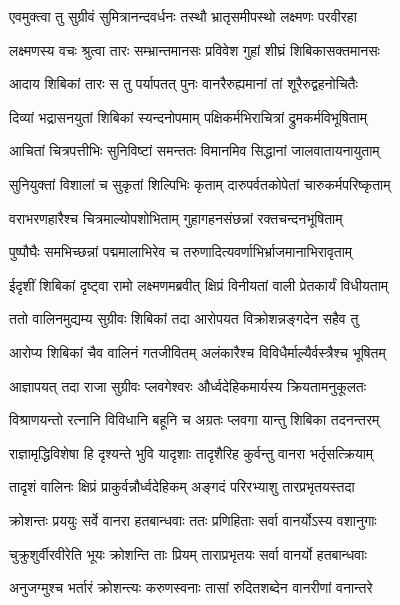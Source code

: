 \twolineshloka
{एवमुक्त्वा तु सुग्रीवं सुमित्रानन्दवर्धनः}
{तस्थौ भ्रातृसमीपस्थो लक्ष्मणः परवीरहा} %

\twolineshloka
{लक्ष्मणस्य वचः श्रुत्वा तारः सम्भ्रान्तमानसः}
{प्रविवेश गुहां शीघ्रं शिबिकासक्तमानसः} %

\twolineshloka
{आदाय शिबिकां तारः स तु पर्यापतत् पुनः}
{वानरैरुह्यमानां तां शूरैरुद्वहनोचितैः} %

\twolineshloka
{दिव्यां भद्रासनयुतां शिबिकां स्यन्दनोपमाम्}
{पक्षिकर्मभिराचित्रां द्रुमकर्मविभूषिताम्} %

\twolineshloka
{आचितां चित्रपत्तीभिः सुनिविष्टां समन्ततः}
{विमानमिव सिद्धानां जालवातायनायुताम्} %

\twolineshloka
{सुनियुक्तां विशालां च सुकृतां शिल्पिभिः कृताम्}
{दारुपर्वतकोपेतां चारुकर्मपरिष्कृताम्} %

\twolineshloka
{वराभरणहारैश्च चित्रमाल्योपशोभिताम्}
{गुहागहनसंछन्नां रक्तचन्दनभूषिताम्} %

\twolineshloka
{पुष्पौघैः समभिच्छन्नां पद्ममालाभिरेव च}
{तरुणादित्यवर्णाभिर्भ्राजमानाभिरावृताम्} %

\twolineshloka
{ईदृशीं शिबिकां दृष्ट्वा रामो लक्ष्मणमब्रवीत्}
{क्षिप्रं विनीयतां वाली प्रेतकार्यं विधीयताम्} %

\twolineshloka
{ततो वालिनमुद्यम्य सुग्रीवः शिबिकां तदा}
{आरोपयत विक्रोशन्नङ्गदेन सहैव तु} %

\twolineshloka
{आरोप्य शिबिकां चैव वालिनं गतजीवितम्}
{अलंकारैश्च विविधैर्माल्यैर्वस्त्रैश्च भूषितम्} %

\twolineshloka
{आज्ञापयत् तदा राजा सुग्रीवः प्लवगेश्वरः}
{और्ध्वदेहिकमार्यस्य क्रियतामनुकूलतः} %

\twolineshloka
{विश्राणयन्तो रत्नानि विविधानि बहूनि च}
{अग्रतः प्लवगा यान्तु शिबिका तदनन्तरम्} %

\twolineshloka
{राज्ञामृद्धिविशेषा हि दृश्यन्ते भुवि यादृशाः}
{तादृशैरिह कुर्वन्तु वानरा भर्तृसत्क्रियाम्} %

\twolineshloka
{तादृशं वालिनः क्षिप्रं प्राकुर्वन्नौर्ध्वदेहिकम्}
{अङ्गदं परिरभ्याशु तारप्रभृतयस्तदा} %

\twolineshloka
{क्रोशन्तः प्रययुः सर्वे वानरा हतबान्धवाः}
{ततः प्रणिहिताः सर्वा वानर्योऽस्य वशानुगाः} %

\twolineshloka
{चुक्रुशुर्वीरवीरेति भूयः क्रोशन्ति ताः प्रियम्}
{ताराप्रभृतयः सर्वा वानर्यो हतबान्धवाः} %

\twolineshloka
{अनुजग्मुश्च भर्तारं क्रोशन्त्यः करुणस्वनाः}
{तासां रुदितशब्देन वानरीणां वनान्तरे} %

